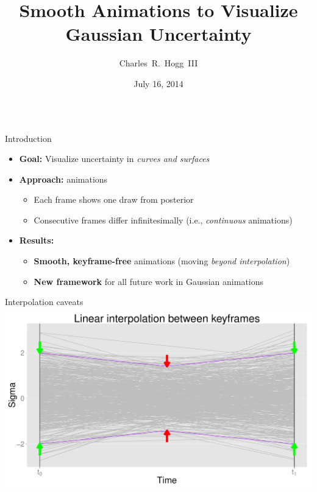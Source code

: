 \documentclass[final,t]{beamer}\usepackage[]{graphicx}\usepackage[]{color}
\title[Smooth Animations]{\huge Smooth Animations to Visualize Gaussian Uncertainty}
\author{Charles~R.~Hogg~III}
\institute[Google]{Google, Inc.}
\date{July 16, 2014}
\makeatletter
\def\maxwidth{ %
  \ifdim\Gin@nat@width>\linewidth
    \linewidth
  \else
    \Gin@nat@width
  \fi
}
\newenvironment{knitrout}{}{} %
\makeatother
\begin{document}
\begin{frame}[fragile]
  \begin{columns}[T,onlytextwidth]

    \begin{column}{.32\linewidth}

      \begin{block}{Introduction}
        \begin{itemize}
          \item \textbf{Goal:} Visualize uncertainty in \textit{curves and
            surfaces}
          \item \textbf{Approach:} animations
            \begin{itemize}
              \item Each frame shows one draw from posterior
              \item Consecutive frames differ infinitesimally (i.e.,
                \textit{continuous} animations)
            \end{itemize}
          \item \textbf{Results:}
            \begin{itemize}
              \item \textbf{Smooth, keyframe-free} animations (moving
                \textit{beyond interpolation})
              \item \textbf{New framework} for all future work in Gaussian
                animations
            \end{itemize}
        \end{itemize}
      \end{block}

      \begin{block}{Interpolation caveats}
\begin{knitrout}
\color{fgcolor}
\includegraphics[width=\maxwidth]{figure/interpolation} 


\end{knitrout}
\end{block}
\end{column}
\end{columns}
\end{frame}
\end{document}

